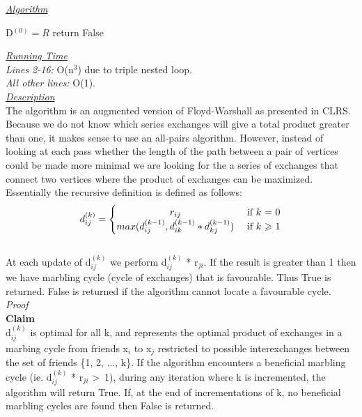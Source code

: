 \documentclass[10pt]{csc_assignment}
\begin{document}
\begin{description}
\emph{\underline{Algorithm}}\\
\begin{algorithm}[H]
 \LinesNumbered 
 D$^{(0)} = R$\;
 return False\;
\end{algorithm}
\emph{\underline{Running Time}}\\
\emph{Lines 2-16:} O(n$^{3}$) due to triple nested loop.\\
\emph{All other lines:} O(1).\\
\emph{\underline{Description}}\\
The algorithm is an augmented version of Floyd-Warshall as presented 
in CLRS. Because we do not know which series exchanges will give a 
total product greater than one, it makes sense to use an all-pairs
algorithm. However, instead of looking at each pass whether the
length of the path between a pair of vertices could be made more 
minimal we are looking for the a series of exchanges that connect
two vertices where the product of exchanges can be maximized.\\
Essentially the recursive definition is defined as follows:\\
\[
d_{ij}^{(k)} = 
\begin{cases} 
      \hfill r_{ij}    \hfill & \text{ if $k$ = 0} \\
      \hfill max(d_{ij}^{(k-1)}, d_{ik}^{(k-1)} * d_{kj}^{(k-1)})\hfill & \text{ if $k$ $\geqslant$ 1} \\
  \end{cases}
\]\\
At each update of d$_{ij}^{(k)}$ we perform d$_{ij}^{(k)}$ * r$_{ji}$. 
If the result is greater than 1 then we have marbling cycle (cycle
 of exchanges) that is favourable. Thus True is returned. 
 False is returned if the algorithm cannot locate a favourable
 cycle.\\
\emph{Proof}\\
\textbf{Claim}\\ d$_{ij}^{(k)}$ is optimal for all k, and represents the optimal product of exchanges in a marbing cycle from friends x$_{i}$ to x$_{j}$ restricted to possible interexchanges between the set of friends \{1, 2, ..., k\}. If the algorithm encounters a beneficial marbling cycle (ie. d$_{ij}^{(k)}$ * r$_{ji}$ \textgreater ~1), during any iteration where k is incremented, the algorithm will return True. If, at the end of incrementations of k, no beneficial marbling cycles are found then False is returned.\\ 

\end{description}
\end{document}
